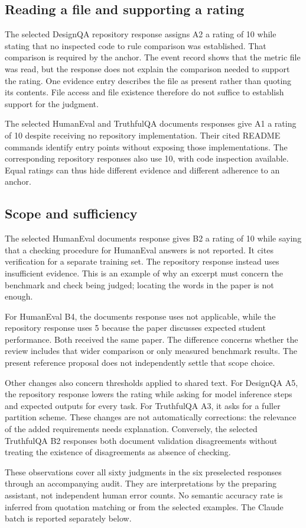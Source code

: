 \subsection{Reading a file and supporting a rating}
The selected DesignQA repository response assigns A2 a rating of 10 while stating that no inspected code to rule comparison was established. That comparison is required by the anchor. The event record shows that the metric file was read, but the response does not explain the comparison needed to support the rating. One evidence entry describes the file as present rather than quoting its contents. File access and file existence therefore do not suffice to establish support for the judgment.

The selected HumanEval and TruthfulQA documents responses give A1 a rating of 10 despite receiving no repository implementation. Their cited README commands identify entry points without exposing those implementations. The corresponding repository responses also use 10, with code inspection available. Equal ratings can thus hide different evidence and different adherence to an anchor.

\subsection{Scope and sufficiency}
The selected HumanEval documents response gives B2 a rating of 10 while saying that a checking procedure for HumanEval answers is not reported. It cites verification for a separate training set. The repository response instead uses insufficient evidence. This is an example of why an excerpt must concern the benchmark and check being judged; locating the words in the paper is not enough.

For HumanEval B4, the documents response uses not applicable, while the repository response uses 5 because the paper discusses expected student performance. Both received the same paper. The difference concerns whether the review includes that wider comparison or only measured benchmark results. The present reference proposal does not independently settle that scope choice.

Other changes also concern thresholds applied to shared text. For DesignQA A5, the repository response lowers the rating while asking for model inference steps and expected outputs for every task. For TruthfulQA A3, it asks for a fuller partition scheme. These changes are not automatically corrections: the relevance of the added requirements needs explanation. Conversely, the selected TruthfulQA B2 responses both document validation disagreements without treating the existence of disagreements as absence of checking.

These observations cover all sixty judgments in the six preselected responses through an accompanying audit. They are interpretations by the preparing assistant, not independent human error counts. No semantic accuracy rate is inferred from quotation matching or from the selected examples. The Claude batch is reported separately below.
